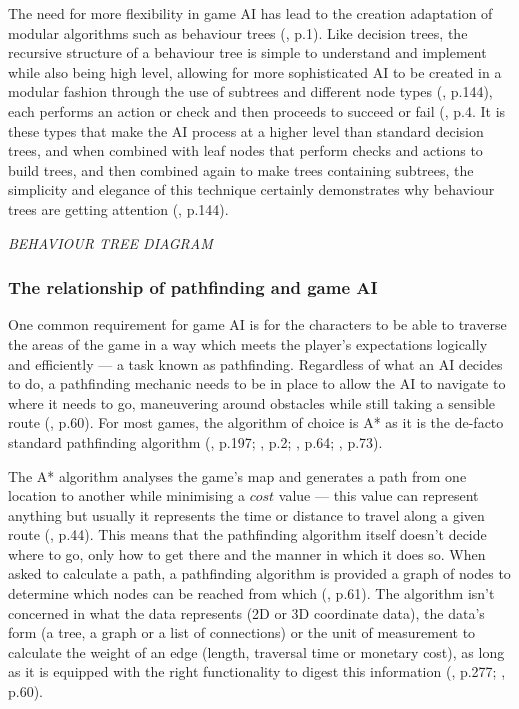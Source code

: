 \documentclass[11pt, a4paper]{article}
\begin{document}
The need for more flexibility in game AI has lead to the creation adaptation of modular algorithms such as behaviour trees (\cite{lim2010evolving}, p.1). Like decision trees, the recursive structure of a behaviour tree is simple to understand and implement while also being high level, allowing for more sophisticated AI to be created in a modular fashion through the use of subtrees and different node types (\cite{shoulson2011parameterizing}, p.144), each performs an action or check and then proceeds to succeed or fail (\cite{lim2010evolving}, p.4. It is these types that make the AI process at a higher level than standard decision trees, and when combined with leaf nodes that perform checks and actions to build trees, and then combined again to make trees containing subtrees, the simplicity and elegance of this technique certainly demonstrates why behaviour trees are getting attention (\cite{shoulson2011parameterizing}, p.144).

\emph{BEHAVIOUR TREE DIAGRAM}

\subsubsection{The relationship of pathfinding and game AI}

One common requirement for game AI is for the characters to be able to traverse the areas of the game in a way which meets the player's expectations logically and efficiently --- a task known as pathfinding. Regardless of what an AI decides to do, a pathfinding mechanic needs to be in place to allow the AI to navigate to where it needs to go, maneuvering around obstacles while still taking a sensible route (\cite{graham2003pathfinding}, p.60). For most games, the algorithm of choice is A* as it is the de-facto standard pathfinding algorithm (\cite{millington2019ai}, p.197; \cite{botea2004near}, p.2; \cite{nareyek2004ai}, p.64; \cite{leigh2007using}, p.73).

The A* algorithm analyses the game's map and generates a path from one location to another while minimising a $cost$ value --- this value can represent anything but usually it represents the time or distance to travel along a given route (\cite{yap2002grid}, p.44). This means that the pathfinding algorithm itself doesn't decide where to go, only how to get there and the manner in which it does so. When asked to calculate a path, a pathfinding algorithm is provided a graph of nodes to determine which nodes can be reached from which (\cite{nareyek2004ai}, p.61). The algorithm isn't concerned in what the data represents (2D or 3D coordinate data), the data's form (a tree, a graph or a list of connections) or the unit of measurement to calculate the weight of an edge (length, traversal time or monetary cost), as long as it is equipped with the right functionality to digest this information (\cite{millington2019ai}, p.277; \cite{graham2003pathfinding}, p.60).
\end{document}
